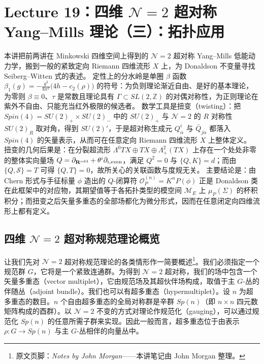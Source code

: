 
\section{Lecture 19：四维 $\mathcal{N}=2$ 超对称 Yang--Mills 理论（三）：拓扑应用}

\begin{keytakeaways}
本讲把前两讲在 Minkowski 四维空间上得到的 $\mathcal{N}=2$ 超对称 Yang--Mills 低能动力学，搬到一般的紧致定向 Riemann 四维流形 $X$ 上，为 Donaldson 不变量寻找 Seiberg--Witten 式的表述。
定性上的分水岭是单圈 $\beta$ 函数 $\beta_1(g)=-\frac{g^3}{8\pi^2}\bigl(4h-c_2(\rho)\bigr)$ 的符号：为负则理论渐近自由、是好的基本理论，为零则 $\beta\equiv0$、$\tau$ 是常数且理论具有 $\Gamma\subset SL(2,\mathbb{Z})$ 的对偶对称性，为正则理论在紫外不自由、只能充当红外极限的候选者。
数学工具是扭变（twisting）：把 $Spin(4)=SU(2)_+\times SU(2)_-$ 中的 $SU(2)_+$ 与 $\mathcal{N}=2$ 的 $R$ 对称性 $SU(2)_R$ 取对角，得到 $SU(2)'$，于是超对称生成元 $Q^i_\alpha$ 与 $\bar Q_{j\dot\alpha}$ 都落入 $Spin(4)$ 的矢量表示，从而可在任意定向 Riemann 四维流形 $X$ 上整体定义。
扭变的几何后果是：在分裂超流形 $\Lambda^0TX\oplus TX\oplus\Lambda^2_+(TX)$ 上存在一个处处非零的整体实向量场 $Q=\partial_{\mathbf{R}^{\rm odd}}+\theta^i\partial_{i,{\rm even}}$，满足 $Q^2=0$ 与 $\{Q,K\}=d$；而由 $\{Q,\mathcal{S}\}=T$ 可得 $\{Q,T\}=0$，故所关心的关联函数与度规无关。
主要结论是：由 Chern 形式与手征标量 $\phi$ 造出的 $Q$-闭算符 $\mathcal{O}_P^{(n)}=K^nP(\phi)$ 正是 Donaldson 类在此框架中的对应物，其期望值等于各拓扑类型的模空间 $\mathcal{M}_E$ 上 $\mu_P(\Sigma)$ 的杯积积分；而扭变之后矢量多重态的全部场都化为微分形式，因而在任意闭定向四维流形上都有定义。
\end{keytakeaways}


\subsection{四维 $\mathcal{N}=2$ 超对称规范理论概览}

让我们先对 $\mathcal{N}=2$ 超对称规范理论的各类情形作一简要概述\footnote{原文页脚：\emph{Notes by John Morgan}——本讲笔记由 John Morgan 整理。}。我们必须指定一个规范群 $G$，它将是一个紧致连通群。为得到 $\mathcal{N}=2$ 超对称，我们的场中包含一个矢量多重态（vector multiplet），它由规范场及其超伙伴场构成，取值于主 $G$-丛的伴随丛（adjoint bundle）。我们也可以有超多重态（hypermultiplet）。设 $n$ 为超多重态的数目。$n$ 个自由超多重态的全局对称群是辛群 $Sp(n)$（即 $n\times n$ 四元数矩阵构成的酉群）。以 $\mathcal{N}=2$ 不变的方式对理论作规范化（gauging），可以通过规范化 $Sp(n)$ 的任意所需子群来实现。因此一般而言，超多重态位于由表示 $\rho:G\to Sp(n)$ 与主 $G$-丛相伴的向量丛中。

